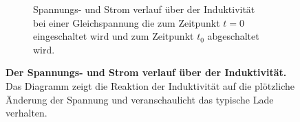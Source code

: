 {\begin{figure}[H]
\begin{subfigure}[b]{0.9\textwidth}
		\caption{Spannungs- und Strom verlauf über der Induktivität bei einer Gleichspannung die zum Zeitpunkt $t = 0$ eingeschaltet
		 wird und zum Zeitpunkt $t_\mathrm{0}$ abgeschaltet wird.}
		\label{fig:Spannungsverlauf}
	\end{subfigure}
	\caption{\textbf{Der Spannungs- und Strom verlauf über der Induktivität.} Das Diagramm zeigt die Reaktion der Induktivität
	auf die plötzliche Änderung der Spannung und
	veranschaulicht das typische Lade verhalten.}
	\label{fig:Gesamtdarstellung}
	\end{figure}
}%

